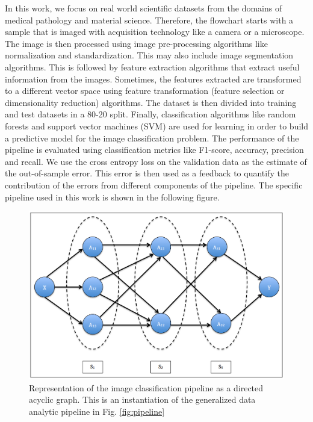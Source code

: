 In this work, we focus on real world scientific datasets from the domains of medical pathology and material science.  Therefore, the flowchart starts with a sample that is imaged with acquisition technology like a camera or a microscope. The image is then processed using image pre-processing algorithms like normalization and standardization. This may also include image segmentation algorithms. This is followed by feature extraction algorithms that extract useful information from the images. Sometimes, the features extracted are transformed to a different vector space using feature transformation (feature selection or dimensionality reduction) algorithms. The dataset is then divided into training and test datasets in a 80-20 split. Finally, classification algorithms like random forests \cite{breiman2001random} and support vector machines (SVM) \cite{cortes1995support} are used for learning in order to build a predictive model for the image classification problem. The performance of the pipeline is evaluated using classification metrics like F1-score, accuracy, precision and recall. We use the cross entropy loss on the validation data as the estimate of the out-of-sample error. This error is then used as a feedback to quantify the contribution of the errors from different components of the pipeline. The specific pipeline used in this work is shown in the following figure.

\begin{figure}[ht!]
    \centering
    \includegraphics[scale=0.3]{img/EP/pipeline}
    \caption{Representation of the image classification pipeline as a directed acyclic graph. This is an instantiation of the generalized data analytic pipeline in Fig. \ref{fig:pipeline}}
    \label{fig:images_pipeline}
\end{figure}

